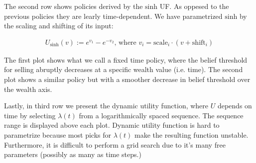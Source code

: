 The second row shows policies derived by the $\text{sinh}$ UF. As oppesed to the previous policies they are learly time-dependent. We have parametrized $\text{sinh}$ by the scaling and shifting of its input:

\begin{align*}
    U_\text{sinh}(v) := e^{v_1} - e^{-v_2} \text{, where\ } v_i = \text{scale}_i\cdot(v+\text{shift}_i)
\end{align*}

The first plot shows what we call a fixed time policy, where the belief threshold for selling abruptly decreases at a specific wealth value (i.e. time).
The second plot shows a similar policy but with a smoother decrease in belief threshold over the wealth axis.

Lastly, in third row we present the dynamic utility function, where $U$ depends on time by selecting $\lambda(t)$ from a logarithmically spaced sequence. The sequence range is displayed above each plot. Dynamic utility function is hard to parametrize because most picks for $\lambda(t)$ make the resulting function unstable. Furthermore, it is difficult to perform a grid search due to it's many free parameters (possibly as many as time steps.)

